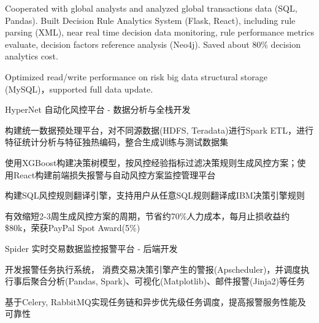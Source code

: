 \documentclass[11pt, a4paper, UTF8]{awesome-cv}
\begin{document}
\begin{cventries}
{\begin{cvitems}
        \item {Cooperated with global analysts and analyzed global transactions data (SQL, Pandas). Built Decision Rule Analytics System (Flask, React), including rule parsing (XML), near real time decision data monitoring, rule performance metrics evaluate, decision factors reference analysis (Neo4j). Saved about 80\% decision analytics cost.}
        \item {Optimized read/write performance on risk big data structural storage (MySQL)，supported full data update.}
      \end{cvitems}
    }
    
  \cventry
    {HyperNet 自动化风控平台 - 数据分析与全栈开发} %
    {} %
    {} %
    {\ } %
    {
      \begin{cvitems} %
        \item {构建统一数据预处理平台，对不同源数据(HDFS, Teradata)进行Spark ETL，进行特征统计分析与特征独热编码，整合生成训练与测试数据集}
        \item {使用XGBoost构建决策树模型，按风控经验指标过滤决策规则生成风控方案；使用React构建前端损失报警与自动风控方案监控管理平台}
        \item {构建SQL风控规则翻译引擎，支持用户从任意SQL规则翻译成IBM决策引擎规则}
        \item {有效缩短2-3周生成风控方案的周期，节省约70\%人力成本，每月止损收益约\$80k，荣获PayPal Spot Award(5\%)}
      \end{cvitems}
    }

  \cventry
    {Spider 实时交易数据监控报警平台 - 后端开发} %
    {} %
    {} %
    {\ } %
    {
      \begin{cvitems} %
        \item {开发报警任务执行系统， 消费交易决策引擎产生的警报(Apscheduler)，并调度执行事后聚合分析(Pandas, Spark)、可视化(Matplotlib)、邮件报警(Jinja2)等任务}
        \item {基于Celery, RabbitMQ实现任务链和异步优先级任务调度，提高报警服务性能及可靠性}
      \end{cvitems}
    }
    

\end{cventries}
\end{document}
